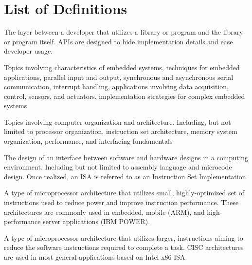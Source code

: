 
\chapter*{List of Definitions}

\begin{definition}
    The layer between a developer that utilizes a library or program and the library or program itself. APIs are designed to hide implementation details and ease developer usage.
\end{definition}

\begin{definition} 
	Topics involving characteristics of embedded systems, techniques for embedded applications, parallel input and output, synchronous and asynchronous serial communication, interrupt handling, applications involving data acquisition, control, sensors, and actuators, implementation strategies for complex embedded systems \cite[p.~118]{cec2016}
\end{definition}

\begin{definition} 
	Topics involving computer organization and architecture. Including, but not limited to processor organization, instruction set architecture, memory system organization, performance, and interfacing fundamentals\cite[p.~118]{cec2016}
\end{definition}

\begin{definition}
    The design of an interface between software and hardware designs in a computing environment. Including but not limited to assembly language and microcode design. Once realized, an ISA is referred to as an Instruction Set Implementation. 
\end{definition}

\begin{definition}
    A type of microprocessor architecture that utilizes small, highly-optimized set of instructions used to reduce power and improve instruction performance\cite{Aletan1992, Stokes1999}. These architectures are commonly used in embedded, mobile (ARM), and high-performance server applications (IBM POWER). 
\end{definition}

\begin{definition}
    A type of microprocessor architecture that utilizes larger, instructions aiming to reduce the software instructions required to complete a task\cite{Aletan1992, Stokes1999}. CISC architectures are used in most general applications based on Intel\textregistered{} x86 ISA\cite{intel2017}.
\end{definition}

